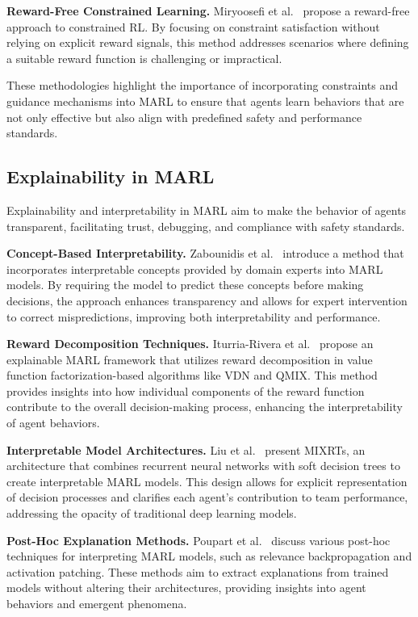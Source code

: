 \documentclass[pdflatex,sn-mathphys-num]{sn-jnl}%
\theoremstyle{thmstyleone}%
\theoremstyle{thmstyletwo}%
\theoremstyle{thmstylethree}%
\begin{document}
\textbf{Reward-Free Constrained Learning.} Miryoosefi et al.~\cite{miryoosefi2021} propose a reward-free approach to constrained RL. By focusing on constraint satisfaction without relying on explicit reward signals, this method addresses scenarios where defining a suitable reward function is challenging or impractical.

These methodologies highlight the importance of incorporating constraints and guidance mechanisms into MARL to ensure that agents learn behaviors that are not only effective but also align with predefined safety and performance standards.


\subsection{Explainability in MARL}\label{sub-sec:rel_evaluation}

Explainability and interpretability in MARL aim to make the behavior of agents transparent, facilitating trust, debugging, and compliance with safety standards.

\textbf{Concept-Based Interpretability.} Zabounidis et al.~\cite{zabounidis2023concept} introduce a method that incorporates interpretable concepts provided by domain experts into MARL models. By requiring the model to predict these concepts before making decisions, the approach enhances transparency and allows for expert intervention to correct mispredictions, improving both interpretability and performance.

\textbf{Reward Decomposition Techniques.} Iturria-Rivera et al.~\cite{iturria2024explainable} propose an explainable MARL framework that utilizes reward decomposition in value function factorization-based algorithms like VDN and QMIX. This method provides insights into how individual components of the reward function contribute to the overall decision-making process, enhancing the interpretability of agent behaviors.

\textbf{Interpretable Model Architectures.} Liu et al.~\cite{liu2025} present MIXRTs, an architecture that combines recurrent neural networks with soft decision trees to create interpretable MARL models. This design allows for explicit representation of decision processes and clarifies each agent's contribution to team performance, addressing the opacity of traditional deep learning models.

\textbf{Post-Hoc Explanation Methods.} Poupart et al.~\cite{poupart2025perspectives} discuss various post-hoc techniques for interpreting MARL models, such as relevance backpropagation and activation patching. These methods aim to extract explanations from trained models without altering their architectures, providing insights into agent behaviors and emergent phenomena.
\end{document}

